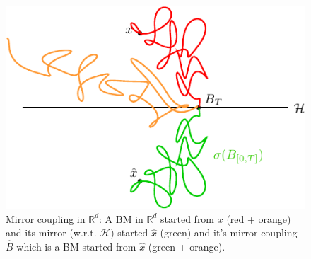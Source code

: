 \documentclass[../mainfile.tex]{subfiles}
\begin{document}
\begin{figure}[hbtp]
\centering
\includegraphics[scale=.9]{mirrorcoupd.pdf}
\caption{Mirror coupling in $\mathbb{R}^d$: A BM in $\mathbb{R}^d$ started from $x$ (red + orange) and its mirror (w.r.t. $\mathcal{H})$ started $\hat{x}$ (green) and it's mirror coupling $\hat{B}$ which is a BM started from $\hat{x}$ (green + orange).}
\end{figure}
\end{document}
